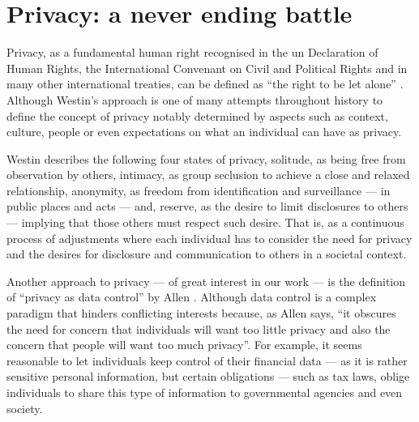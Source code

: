 
\section{Privacy: a never ending battle}
    \label{section:thesis:privacy-a-never-ending-battle}

Privacy, as a fundamental human right recognised in the \ac{un} Declaration of Human 
Rights, the International Convenant on Civil and Political Rights and in many other 
international treaties, can be defined as ``the right to be let alone'' \cite{Westin70}. 
Although Westin's approach is one of many attempts throughout history to define 
the concept of privacy notably determined by aspects such as context, culture, people 
or even expectations on what an individual can have as privacy.

Westin describes the following four states of privacy, solitude, as being free from 
observation by others, intimacy, as group seclusion to achieve a close and relaxed 
relationship, anonymity, as freedom from identification and surveillance --- in 
public places and acts --- and, reserve, as the desire to limit disclosures to others 
--- implying that those others must respect such desire. That is, as a continuous 
process of adjustments where each individual has to consider the need for privacy 
and the desires for disclosure and communication to others in a societal context.

Another approach to privacy --- of great interest in our work --- is the definition 
of ``privacy as data control'' by Allen \cite{Allen99}. Although data control is 
a complex paradigm that hinders conflicting interests because, as Allen says, ``it 
obscures the need for concern that individuals will want too little privacy and 
also the concern that people will want too much privacy''. For example, it seems 
reasonable to let individuals keep control of their financial data --- as it is 
rather sensitive personal information, but certain obligations --- such as tax laws, 
oblige individuals to share this type of information to governmental agencies and 
even society.

